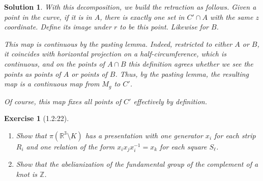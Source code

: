 \documentclass{article}
\theoremstyle{plain}
\newtheorem*{ex}{Exercise}
\theoremstyle{nonumberplain}
\newtheorem{sol}{Solution}
\newcommand{\R}{\mathbb{R}}
\newcommand{\Z}{\mathbb{Z}}
\begin{document}
\begin{sol}
With this decomposition, we build the retraction as follows. Given a point in the curve, if it is in $A$, there is exactly one set in $C' \cap A$ with the same $z$ coordinate. Define its image under $r$ to be this point. Likewise for $B$.

This map is continuous by the pasting lemma. Indeed, restricted to either $A$ or $B$, it coincides with horizontal projection on a half-circumference, which is continuous, and on the points of $A \cap B$ this definition agrees whether we see the points as points of $A$ or points of $B$. Thus, by the pasting lemma, the resulting map is a continuous map from $M_g$ to $C'$.

Of course, this map fixes all points of $C'$ effectively by definition.
\end{sol}

\begin{ex}[1.2:22]
\leavevmode
\begin{enumerate}
\item Show that $\pi(\R^3 \setminus K)$ has a presentation with one generator $x_i$ for each strip $R_i$ and one relation of the form $x_i x_j x_i^{-1} = x_k$ for each square $S_\ell$.
\item Show that the abelianization of the fundamental group of the complement of a knot is $\Z$.
\end{enumerate}
\end{ex}
\end{document}
